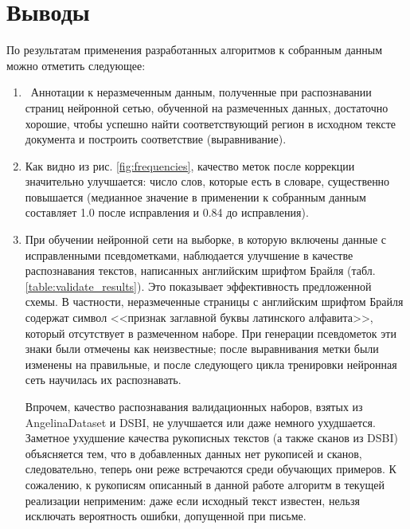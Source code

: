 \documentclass{main.tex}[subfiles]
\begin{document}
\newpage
\section{Выводы}

По результатам применения разработанных алгоритмов к собранным данным можно отметить следующее:
\begin{enumerate}[noitemsep]
	\item  Аннотации к неразмеченным данным, полученные при распознавании страниц нейронной сетью, обученной на размеченных данных, достаточно хорошие, чтобы успешно найти соответствующий регион в исходном тексте документа и построить соответствие (выравнивание).
	\item Как видно из рис. \ref{fig:frequencies}, качество меток после коррекции значительно улучшается: число слов, которые есть в словаре, существенно повышается (медианное значение в применении к собранным данным составляет 1.0 после исправления и 0.84 до исправления).
	\item При обучении нейронной сети на выборке, в которую включены данные с исправленными псевдометками, наблюдается улучшение в качестве распознавания текстов, написанных английским шрифтом Брайля (табл. \ref{table:validate_results}).
	Это показывает эффективность предложенной схемы.
	В частности, неразмеченные страницы с английским шрифтом Брайля содержат символ <<признак заглавной буквы латинского алфавита>>, который отсутствует в размеченном наборе.
	При генерации псевдометок эти знаки были отмечены как неизвестные; после выравнивания метки были изменены на правильные, и после следующего цикла тренировки нейронная сеть научилась их распознавать.
	
	Впрочем, качество распознавания валидационных наборов, взятых из AngelinaDataset и DSBI, не улучшается или даже немного ухудшается.
	Заметное ухудшение качества рукописных текстов (а также сканов из DSBI) объясняется тем, что в добавленных данных нет рукописей и сканов, следовательно, теперь они реже встречаются среди обучающих примеров.
	К сожалению, к рукописям описанный в данной работе алгоритм в текущей реализации неприменим: даже если исходный текст известен, нельзя исключать вероятность ошибки, допущенной при письме.
\end{enumerate}
\end{document}
